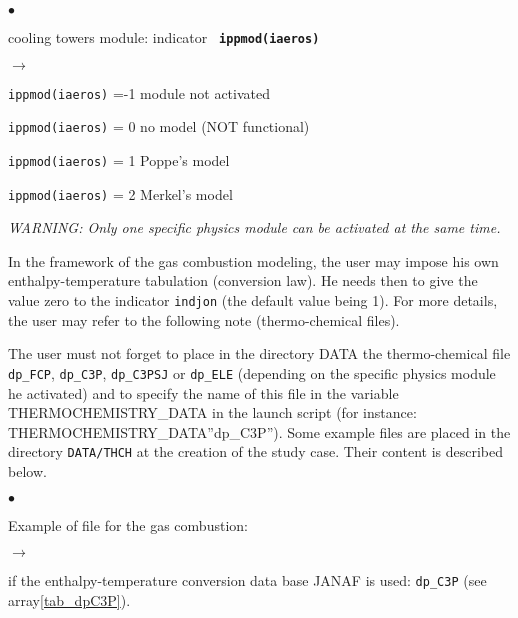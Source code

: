 {{{\begin{list}{$\bullet$}{}
       \item cooling towers module: indicator {\bf \tt
             ippmod(iaeros)}
        \begin{list}{$\rightarrow$}{}
               \item \texttt{ippmod(iaeros\index)} =-1 module not activated
               \item \texttt{ippmod(iaeros\index)} = 0 no model (NOT functional)
               \item \texttt{ippmod(iaeros\index)} = 1 Poppe's model
               \item \texttt{ippmod(iaeros\index)} = 2 Merkel's model
         \end{list}
\end{list}

{\em WARNING: Only one specific physics module can be activated at the
same time.}

In the framework of the gas combustion modeling, the user may impose
his own enthalpy-temperature tabulation (conversion law). He needs then
to give the
value zero to the indicator \texttt{indjon} (the default value
being 1). For more details, the user may refer to the following note
(thermo-chemical files).

The user must not forget to place in the directory DATA the
thermo-chemical file \texttt{dp\_FCP}, \texttt{dp\_C3P}, \texttt{dp\_C3PSJ} or
\texttt{dp\_ELE} (depending on the specific physics module he activated)
and to specify the name of this file in the variable
THERMOCHEMISTRY\_DATA in the launch script
(for instance: THERMOCHEMISTRY\_DATA''dp\_C3P''). Some example files
are placed in the directory \texttt{DATA/THCH} at the creation of the
study case. Their content is described below.

\begin{list}{$\bullet$}{}
       \item Example of file for the gas combustion:
        \begin{list}{$\rightarrow$}{}
               \item if the enthalpy-temperature conversion data base
                     JANAF is used: \texttt{dp\_C3P} (see
                     array\ref{tab_dpC3P}).


\end{list}
\end{list}}}}

